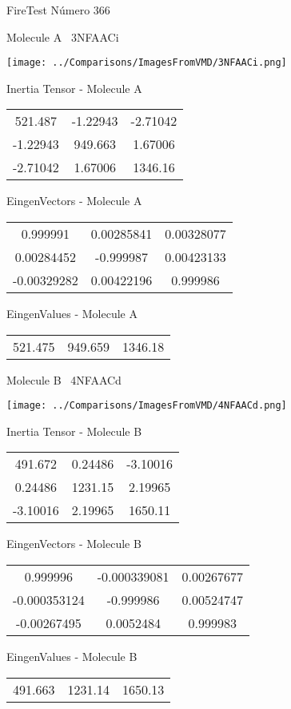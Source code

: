 \vtab[-3cm]
\begin{center}
{\large FireTest \tab Número 366}
\end{center}
\begin{multicols}{2}
\begin{center}

Molecule A \
3NFAACi

\texttt{[image: ../Comparisons/ImagesFromVMD/3NFAACi.png]}

Inertia Tensor - Molecule A \\
\begin{tabular}{|c c c|}
521.487	 & 	-1.22943	 & 	-2.71042	 \\
-1.22943	 & 	949.663	 & 	1.67006	 \\
-2.71042	 & 	1.67006	 & 	1346.16
\end{tabular}

\vtab
 EingenVectors - Molecule A     \\
\begin{tabular}{|c c c|}
0.999991	 & 	0.00285841	 & 	0.00328077	 \\
0.00284452	 & 	-0.999987	 & 	0.00423133	 \\
-0.00329282	 & 	0.00422196	 & 	0.999986
\end{tabular}

\vtab
 EingenValues - Molecule A     \\
\begin{tabular}{|c c c|}
521.475	 & 	949.659	 & 	1346.18	 \\
\end{tabular}
\columnbreak

Molecule B \
4NFAACd

\texttt{[image: ../Comparisons/ImagesFromVMD/4NFAACd.png]}

Inertia Tensor - Molecule B \\
\begin{tabular}{|c c c|}
491.672	 & 	0.24486	 & 	-3.10016	 \\
0.24486	 & 	1231.15	 & 	2.19965	 \\
-3.10016	 & 	2.19965	 & 	1650.11
\end{tabular}

\vtab
 EingenVectors - Molecule B     \\
\begin{tabular}{|c c c|}
0.999996	 & 	-0.000339081	 & 	0.00267677	 \\
-0.000353124	 & 	-0.999986	 & 	0.00524747	 \\
-0.00267495	 & 	0.0052484	 & 	0.999983
\end{tabular}

\vtab
 EingenValues - Molecule B     \\
\begin{tabular}{|c c c|}
491.663	 & 	1231.14	 & 	1650.13	 \\
\end{tabular}

\end{center}
\end{multicols}

